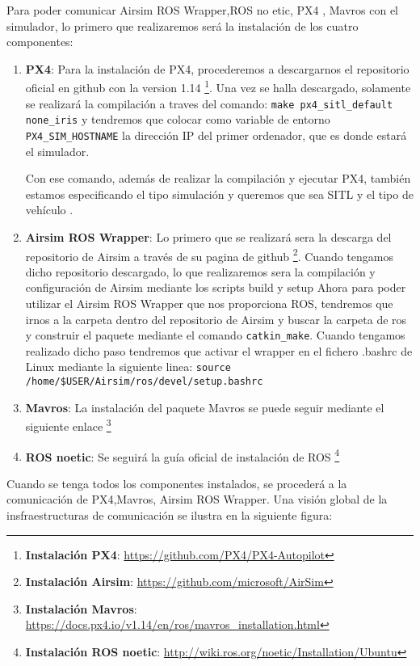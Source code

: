   Para poder comunicar Airsim ROS Wrapper,ROS no etic, PX4 , Mavros con el simulador, lo primero que realizaremos será la instalación de los cuatro componentes:
  \begin{enumerate}
    \item \textbf{PX4}: Para la instalación de PX4, procederemos a descargarnos el repositorio oficial en github con la version 1.14 \footnote{\textbf{Instalación PX4}: \url{https://github.com/PX4/PX4-Autopilot}}.
    Una vez se halla descargado, solamente se realizará la compilación a traves del comando: \texttt{make px4\_sitl\_default none\_iris} y tendremos que colocar como variable de entorno 
    \texttt{PX4\_SIM\_HOSTNAME} la dirección IP del primer ordenador, que es donde estará el simulador.

    Con ese comando, además de realizar la compilación y ejecutar PX4, también estamos especificando el tipo simulación y queremos que sea SITL y el tipo de vehículo .
    \item \textbf{Airsim ROS Wrapper}: Lo primero que se realizará sera la descarga del repositorio de Airsim a través de su pagina de github \footnote{\textbf{Instalación Airsim}: \url{https://github.com/microsoft/AirSim}}. 
    Cuando tengamos dicho repositorio descargado, lo que realizaremos sera la compilación y configuración de Airsim mediante los scripts build y setup
    \newline
    Ahora para poder utilizar el Airsim ROS Wrapper que nos proporciona ROS, tendremos que irnos a la carpeta dentro del repositorio de Airsim y buscar la carpeta de ros y construir el paquete 
    mediante el comando \texttt{catkin\_make}. Cuando tengamos realizado dicho paso tendremos que activar el wrapper en el fichero .bashrc de Linux mediante la siguiente linea:
    \texttt{source /home/\$USER/Airsim/ros/devel/setup.bashrc}
    \item \textbf{Mavros}: La instalación del paquete Mavros se puede seguir mediante el siguiente enlace \footnote{\textbf{Instalación Mavros}: \url{https://docs.px4.io/v1.14/en/ros/mavros_installation.html}}
    \item \textbf{ROS noetic}: Se seguirá la guía oficial de instalación de ROS \footnote{\textbf{Instalación ROS noetic}: \url{http://wiki.ros.org/noetic/Installation/Ubuntu}}

  \end{enumerate}

  Cuando se tenga todos los componentes instalados, se procederá a la comunicación de PX4,Mavros, Airsim ROS Wrapper. Una visión global de la insfraestructuras de comunicación se ilustra
  en la siguiente figura: 



